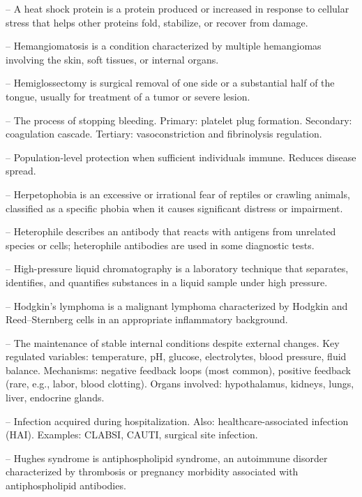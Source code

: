 -- A heat shock protein is a protein produced or increased in response to cellular stress that helps other proteins fold, stabilize, or recover from damage.

-- Hemangiomatosis is a condition characterized by multiple hemangiomas involving the skin, soft tissues, or internal organs.

-- Hemiglossectomy is surgical removal of one side or a substantial half of the tongue, usually for treatment of a tumor or severe lesion.

-- The process of stopping bleeding. Primary: platelet plug formation. Secondary: coagulation cascade. Tertiary: vasoconstriction and fibrinolysis regulation.

-- Population-level protection when sufficient individuals immune. Reduces disease spread.

-- Herpetophobia is an excessive or irrational fear of reptiles or crawling animals, classified as a specific phobia when it causes significant distress or impairment.

-- Heterophile describes an antibody that reacts with antigens from unrelated species or cells; heterophile antibodies are used in some diagnostic tests.

-- High-pressure liquid chromatography is a laboratory technique that separates, identifies, and quantifies substances in a liquid sample under high pressure.

-- Hodgkin's lymphoma is a malignant lymphoma characterized by Hodgkin and Reed--Sternberg cells in an appropriate inflammatory background.

-- The maintenance of stable internal conditions despite external changes. Key regulated variables: temperature, pH, glucose, electrolytes, blood pressure, fluid balance. Mechanisms: negative feedback loops (most common), positive feedback (rare, e.g., labor, blood clotting). Organs involved: hypothalamus, kidneys, lungs, liver, endocrine glands.

-- Infection acquired during hospitalization. Also: healthcare-associated infection (HAI). Examples: CLABSI, CAUTI, surgical site infection.

-- Hughes syndrome is antiphospholipid syndrome, an autoimmune disorder characterized by thrombosis or pregnancy morbidity associated with antiphospholipid antibodies.

